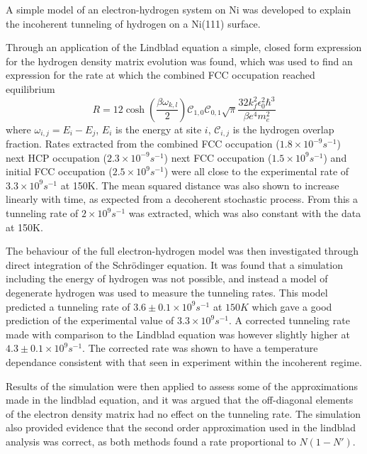 A simple model of
an electron-hydrogen
system on Ni
was developed
to explain the
incoherent tunneling
of hydrogen on a
Ni(111) surface. %

Through an application
of the Lindblad equation
a simple, closed form
expression for
the hydrogen density matrix
evolution was found,
which was used to
find an expression
for the rate at which
the combined
FCC occupation reached
equilibrium
\begin{equation}
    R   =
    12\cosh{(\frac{\beta \omega_{k,l}}{2})}
    \mathcal{C}_{1,0}\mathcal{C}_{0,1}
    \sqrt{\pi} \frac{32 k_f^2 \epsilon_0^2 \hbar^3}{\beta e^4 m_e^2}
\end{equation}
where \(\omega_{i,j}=E_i - E_j\),
\(E_i\) is the energy at site \(i\),
\(\mathcal{C}_{i,j}\) is the hydrogen
overlap fraction.
Rates extracted from
the combined FCC
occupation (\(1.8\times{}10^{-9}s^{-1}\))
next HCP occupation
(\(2.3\times{}10^{-9}s^{-1}\))
next FCC occupation
(\(1.5\times{}10^9s^{-1}\))
and initial FCC occupation
(\(2.5\times{}10^9s^{-1}\))
were all close to the
experimental rate
of \(3.3 \times{}10^{9}s^{-1}\)
at 150K\cite{Jianding-Zhu}.
The mean squared distance
was also shown to increase
linearly with time, as expected
from a decoherent stochastic
process. From this
a tunneling rate of
\(2 \times{}10^{9}s^{-1}\)
was extracted,
which was also constant with
the data at 150K.

The behaviour of the
full electron-hydrogen
model was then
investigated through
direct integration of
the Schrödinger equation.
It was found that a
simulation
including the energy of
hydrogen was not possible,
and instead a model
of degenerate hydrogen
was used to measure the
tunneling rates.
This model predicted
a tunneling rate of
\(3.6\pm 0.1\times{}10^{9}s^{-1}\)
at \(150K\)
which gave a good
prediction of the
experimental value
of
\(3.3 \times{}10^{9}s^{-1}\)\cite{Jianding-Zhu}.
A corrected tunneling rate
made with comparison
to the Lindblad equation
was
however slightly
higher at
\(4.3\pm 0.1\times{}10^{9}s^{-1}\).
The corrected rate was shown to have
a temperature dependance
consistent with that seen in
experiment
within the incoherent regime.



Results of the simulation
were then applied
to assess some of the
approximations
made in the lindblad equation,
and it was argued that
the off-diagonal
elements of the electron
density matrix
had no effect on the tunneling
rate. The simulation
also provided evidence
that the second order approximation
used in the lindblad analysis
was correct,
as both methods found a
rate proportional to \(N(1-N')\).

